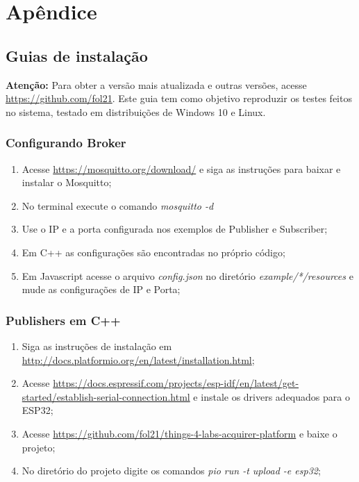 

\chapter{Apêndice}
\label{chapter:apendice}

\section{Guias de instalação}
\label{section:guia}

\textbf{Atenção:} Para obter a versão mais atualizada e outras versões, acesse \url{https://github.com/fol21}. Este guia tem como objetivo reproduzir os testes feitos no sistema, testado em distribuições de Windows 10 e Linux.

\subsection{Configurando Broker}
\label{subsection:guia_broker}

\begin{enumerate}

\item Acesse \url{https://mosquitto.org/download/} e siga as instruções para baixar e instalar o Mosquitto;
\item No terminal execute o comando \textit{mosquitto -d}
\item Use o IP e a porta configurada nos exemplos de Publisher e Subscriber;
\item Em C++ as configurações são encontradas no próprio código;
\item Em Javascript acesse o arquivo \textit{config.json} no diretório \textit{example/*/resources} e mude as configurações de IP e Porta;
\end{enumerate}

\subsection{Publishers em C++}
\label{subsection:guia_publishers_cpp}

\begin{enumerate}

\item Siga as instruções de instalação em \url{http://docs.platformio.org/en/latest/installation.html};
\item Acesse \url{https://docs.espressif.com/projects/esp-idf/en/latest/get-started/establish-serial-connection.html} e instale os drivers adequados para o ESP32;
\item Acesse \url{https://github.com/fol21/things-4-labs-acquirer-platform} e baixe o projeto;
\item No diretório do projeto digite os comandos \textit{pio run -t upload -e esp32};
\end{enumerate}

